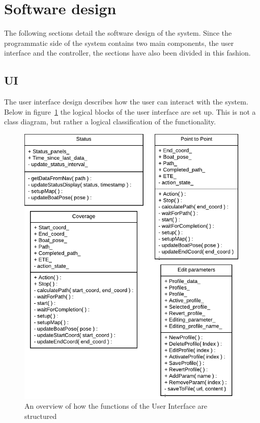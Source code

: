 \section{Software design}
\label{sec:software_design}
The following sections detail the software design of the system. Since the programmatic side of the system contains two main components, the user interface and the controller, the sections have also been divided in this fashion.

\subsection{UI}

The user interface design describes how the user can interact with the system. Below in figure~\ref{fig:userinterfaceoverview} the logical blocks of the user interface are set up. This is not a class diagram, but rather a logical classification of the functionality.

\begin{figure}[H]
	\centering
	\includegraphics[width=1\linewidth]{Images/Design/User_Interface_overview}
	\caption{An overview of how the functions of the User Interface are structured}
	\label{fig:userinterfaceoverview}
\end{figure}


